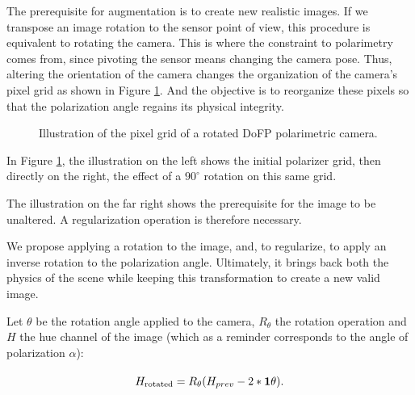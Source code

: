 The prerequisite for augmentation is to create new realistic images. If we transpose an image rotation to the sensor point of view, this procedure is equivalent to rotating the camera. 
This is where the constraint to polarimetry comes from, since pivoting the sensor means changing the camera pose.
Thus, altering the orientation of the camera changes the organization of the camera's pixel grid as shown in Figure \ref{rottheo}. And the objective is to reorganize these pixels so that the polarization angle regains its physical integrity.

\begin{figure}[h]
	\vspace{0.3cm}
	\centering
	
	
	\caption{Illustration of the pixel grid of a rotated DoFP polarimetric camera. }\label{rottheo}
\end{figure}

In Figure \ref{rottheo}, the illustration on the left shows the initial polarizer grid, then directly on the right, the effect of a $90^\circ$ rotation on this same grid.

The illustration on the far right shows the prerequisite for the image to be unaltered. A regularization operation is therefore necessary.

We propose applying a rotation to the image, and, to regularize, to apply an inverse rotation to the polarization angle. Ultimately, it brings back both the physics of the scene while keeping this transformation to create a new valid image.

Let $\theta$ be the rotation angle applied to the camera, $R_\theta$ the rotation operation and $H$ the hue channel of the image (which as a reminder corresponds to the angle of polarization $\alpha$):

\begin{equation}\label{eq:Rot}
H_{\textrm{rotated}} = R_{\theta} (H_{prev} - 2 * \textrm{\Big{.\textbf{1}}}\theta).
\end{equation}



